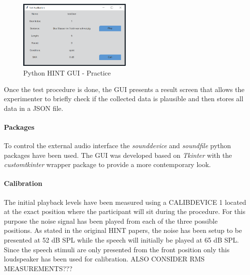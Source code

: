 \documentclass[a4paper,11pt]{article}%
\renewcommand{\\}{\vspace*{0.5\baselineskip} \newline}
\begin{document}
\newline
\begin{figure}[h!]
	\centering
	\includegraphics[width=0.5\textwidth]{PythonHINT-Practice.png}
	\caption{Python HINT GUI - Practice}
	\label{fig:pyhint-practice}
\end{figure}
\newline
Once the test procedure is done, the \ac{GUI} presents a result screen that allows the experimenter to briefly check if the collected data is plausible and then stores all data in a \ac{JSON} file.

\paragraph{Packages} To control the external audio interface the \textit{sounddevice} \cite{Sounddevice} and \textit{soundfile} python packages have been used. The \ac{GUI} was developed based on \textit{Tkinter} with the \textit{customtkinter} wrapper package to provide a more contemporary look.

\paragraph{Calibration} The initial playback levels have been measured using a CALIBDEVICE 1 located at the exact position where the participant will sit during the procedure. For this purpose the noise signal has been played from each of the three possible positions. As stated in the original \ac{HINT} papers, the noise has been setup to be presented at 52 dB \acs{SPL} while the speech will initially be played at 65 dB \ac{SPL}. Since the speech stimuli are only presented from the \dq front\dq{} position only this loudspeaker has been used for calibration.
\newline
\newline
ALSO CONSIDER RMS MEASUREMENTS???
\end{document}
